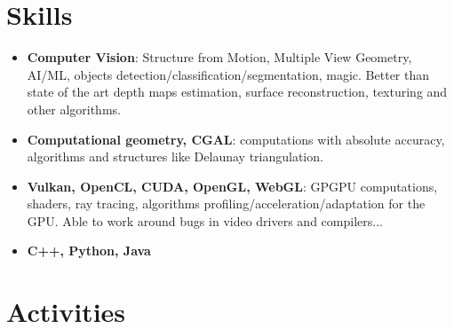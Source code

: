 \documentclass[11pt,oneside]{article}
\begin{document}
\vspace{-9pt}
\section*{\textbf{Skills}}
\vspace{-9pt}

\begin{itemize}
    \item{\textbf{Computer Vision}}: Structure from Motion, Multiple View Geometry, AI/ML, objects detection/classification/segmentation, magic.
    Better than state of the art depth maps estimation, surface reconstruction, texturing and other algorithms.

    \item{\textbf{Computational geometry, CGAL}}: computations with absolute accuracy, algorithms and structures like Delaunay triangulation.

    \item{\textbf{Vulkan, OpenCL, CUDA, OpenGL, WebGL}}: GPGPU computations, shaders, ray tracing, algorithms profiling/acceleration/adaptation for the GPU. Able to work around bugs in video drivers and compilers...

    \item{\textbf{C++, Python, Java}}
\end{itemize}


\vspace{-9pt}
\section*{\textbf{Activities}}
\vspace{-9pt}
\end{document}
